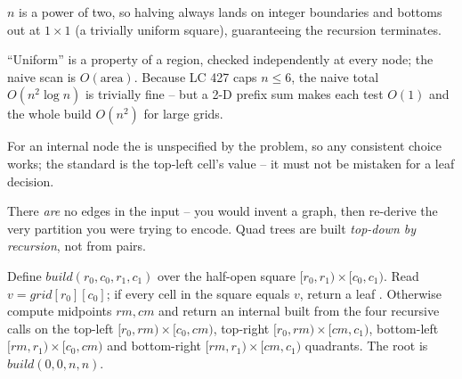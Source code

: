 \begin{observation}
$n$ is a power of two, so halving always lands on integer boundaries and bottoms out at $1\times1$
(a trivially uniform square), guaranteeing the recursion terminates.
\end{observation}
\begin{observation}
``Uniform'' is a property of a region, checked independently at every node; the naive scan is
$O(\text{area})$. Because LC 427 caps $n\le6$, the naive total $O(n^2\log n)$ is trivially fine --
but a 2-D prefix sum makes each test $O(1)$ and the whole build $O(n^2)$ for large grids.
\end{observation}
\begin{observation}
For an internal node the  is unspecified by the problem, so any consistent choice works;
the standard is the top-left cell's value -- it must not be mistaken for a leaf decision.
\end{observation}

\begin{thinkbox}
{There \emph{are} no edges in the input -- you would invent a graph, then re-derive the very
partition you were trying to encode. Quad trees are built \emph{top-down by recursion}, not from pairs.}
\end{thinkbox}

Define $\mathit{build}(r_0,c_0,r_1,c_1)$ over the half-open square $[r_0,r_1)\times[c_0,c_1)$. Read
$v=\mathit{grid}[r_0][c_0]$; if every cell in the square equals $v$, return a leaf .
Otherwise compute midpoints $rm,cm$ and return an internal  built from
the four recursive calls on the top-left $[r_0,rm)\times[c_0,cm)$, top-right $[r_0,rm)\times[cm,c_1)$,
bottom-left $[rm,r_1)\times[c_0,cm)$ and bottom-right $[rm,r_1)\times[cm,c_1)$ quadrants. The root
is $\mathit{build}(0,0,n,n)$.

